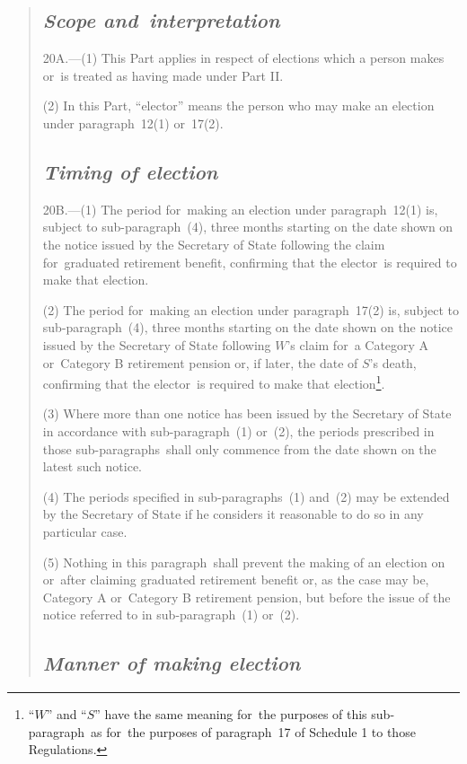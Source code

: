 \documentclass[12pt,a4paper]{article}
\begin{document}
\begin{enumerate}
\begin{quotation}
\subsection*{\itshape Scope and~interpretation}

20A.---(1)  This Part applies in respect of elections which a person makes or~is treated as having made under Part II.

(2) In this Part, “elector” means the person who may make an election under paragraph~12(1) or~17(2).

\subsection*{\itshape Timing of election}

20B.---(1)  The period for~making an election under paragraph~12(1) is, subject to sub-paragraph~(4), three months starting on the date shown on the notice issued by the Secretary of State following the claim for~graduated retirement benefit, confirming that the elector~is required to make that election.

\begin{sloppypar}
(2) The period for~making an election under paragraph~17(2) is, subject to sub-paragraph~(4), three months starting on the date shown on the notice issued by the Secretary of State following $W$’s claim for~a Category A or~Category B retirement pension or, if later, the date of $S$’s death, confirming that the elector~is required to make that election\footnote{“$W$” and “$S$” have the same meaning for~the purposes of this sub-paragraph~as for~the purposes of paragraph~17 of Schedule 1 to those Regulations.}.
\end{sloppypar}

(3) Where more than one notice has been issued by the Secretary of State in accordance with sub-paragraph~(1) or~(2), the periods prescribed in those sub-paragraphs~shall only commence from the date shown on the latest such notice.

(4) The periods specified in sub-paragraphs~(1) and~(2) may be extended by the Secretary of State if he considers it reasonable to do so in any particular case.

(5) Nothing in this paragraph~shall prevent the making of an election on or~after claiming graduated retirement benefit or, as the case may be, Category A or~Category B retirement pension, but before the issue of the notice referred to in sub-paragraph~(1) or~(2).

\subsection*{\itshape Manner of making election}


\end{quotation}
\end{enumerate}
\end{document}
